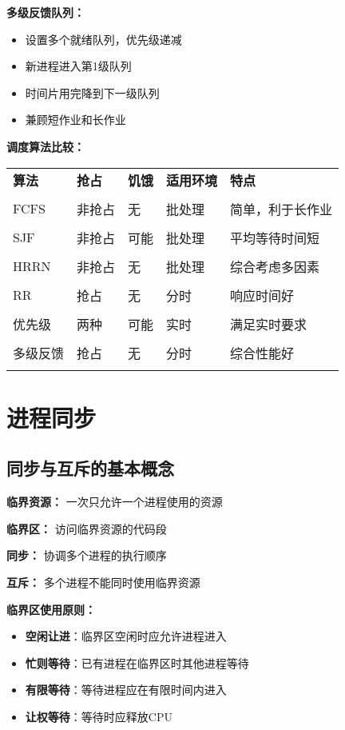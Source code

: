 \documentclass[lang=cn,newtx,10pt,scheme=chinese]{../../elegantbook}
\begin{document}
\textbf{多级反馈队列：}
\begin{itemize}
  \item 设置多个就绪队列，优先级递减
  \item 新进程进入第1级队列
  \item 时间片用完降到下一级队列
  \item 兼顾短作业和长作业
\end{itemize}

\textbf{调度算法比较：}
\begin{longtable}{@{}p{3cm}p{2cm}p{2cm}p{3cm}p{3cm}@{}}
\toprule
\textbf{算法} & \textbf{抢占} & \textbf{饥饿} & \textbf{适用环境} & \textbf{特点} \\\\ \midrule
\endhead

FCFS & 非抢占 & 无 & 批处理 & 简单，利于长作业 \\\\
SJF & 非抢占 & 可能 & 批处理 & 平均等待时间短 \\\\
HRRN & 非抢占 & 无 & 批处理 & 综合考虑多因素 \\\\
RR & 抢占 & 无 & 分时 & 响应时间好 \\\\
优先级 & 两种 & 可能 & 实时 & 满足实时要求 \\\\
多级反馈 & 抢占 & 无 & 分时 & 综合性能好 \\\\

\bottomrule
\end{longtable}

\section{进程同步}

\subsection{同步与互斥的基本概念}

\textbf{临界资源：}
一次只允许一个进程使用的资源

\textbf{临界区：}
访问临界资源的代码段

\textbf{同步：}
协调多个进程的执行顺序

\textbf{互斥：}
多个进程不能同时使用临界资源

\textbf{临界区使用原则：}
\begin{itemize}
  \item \textbf{空闲让进}：临界区空闲时应允许进程进入
  \item \textbf{忙则等待}：已有进程在临界区时其他进程等待
  \item \textbf{有限等待}：等待进程应在有限时间内进入
  \item \textbf{让权等待}：等待时应释放CPU
\end{itemize}
\end{document}
